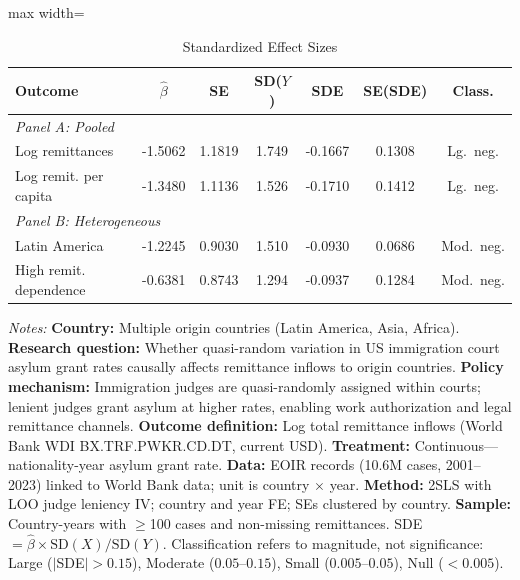 \begin{table}[!t]
\centering
\caption{Standardized Effect Sizes}
\label{tab:sde}
\begin{threeparttable}
\begin{adjustbox}{max width=\textwidth}
\begin{tabular}{lcccccc}
\hline\hline
Outcome & $\hat{\beta}$ & SE & SD($Y$) & SDE & SE(SDE) & Class. \\
\hline
\multicolumn{7}{l}{\textit{Panel A: Pooled}} \\
Log remittances & -1.5062 & 1.1819 & 1.749 & -0.1667 & 0.1308 & Lg.\ neg. \\
Log remit. per capita & -1.3480 & 1.1136 & 1.526 & -0.1710 & 0.1412 & Lg.\ neg. \\
\hline
\multicolumn{7}{l}{\textit{Panel B: Heterogeneous}} \\
Latin America & -1.2245 & 0.9030 & 1.510 & -0.0930 & 0.0686 & Mod.\ neg. \\
High remit. dependence & -0.6381 & 0.8743 & 1.294 & -0.0937 & 0.1284 & Mod.\ neg. \\
\hline\hline
\end{tabular}
\end{adjustbox}
\begin{tablenotes}[flushleft]
\scriptsize
\item \textit{Notes:} \textbf{Country:} Multiple origin countries (Latin America, Asia, Africa). \textbf{Research question:} Whether quasi-random variation in US immigration court asylum grant rates causally affects remittance inflows to origin countries. \textbf{Policy mechanism:} Immigration judges are quasi-randomly assigned within courts; lenient judges grant asylum at higher rates, enabling work authorization and legal remittance channels. \textbf{Outcome definition:} Log total remittance inflows (World Bank WDI BX.TRF.PWKR.CD.DT, current USD). \textbf{Treatment:} Continuous---nationality-year asylum grant rate. \textbf{Data:} EOIR records (10.6M cases, 2001--2023) linked to World Bank data; unit is country $\times$ year. \textbf{Method:} 2SLS with LOO judge leniency IV; country and year FE; SEs clustered by country. \textbf{Sample:} Country-years with $\geq$100 cases and non-missing remittances. SDE $= \hat{\beta} \times \text{SD}(X) / \text{SD}(Y)$. Classification refers to magnitude, not significance: Large ($|$SDE$|>0.15$), Moderate ($0.05$--$0.15$), Small ($0.005$--$0.05$), Null ($<0.005$).
\end{tablenotes}
\end{threeparttable}
\end{table}
